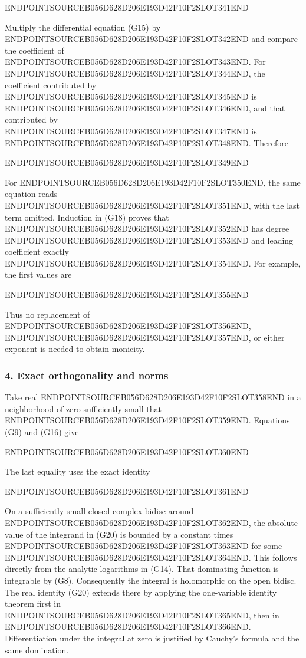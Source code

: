 ENDPOINTSOURCEB056D628D206E193D42F10F2SLOT341END

Multiply the differential equation (G15) by ENDPOINTSOURCEB056D628D206E193D42F10F2SLOT342END and compare the coefficient of ENDPOINTSOURCEB056D628D206E193D42F10F2SLOT343END. For ENDPOINTSOURCEB056D628D206E193D42F10F2SLOT344END, the coefficient contributed by ENDPOINTSOURCEB056D628D206E193D42F10F2SLOT345END is ENDPOINTSOURCEB056D628D206E193D42F10F2SLOT346END, and that contributed by ENDPOINTSOURCEB056D628D206E193D42F10F2SLOT347END is ENDPOINTSOURCEB056D628D206E193D42F10F2SLOT348END. Therefore

ENDPOINTSOURCEB056D628D206E193D42F10F2SLOT349END

For ENDPOINTSOURCEB056D628D206E193D42F10F2SLOT350END, the same equation reads ENDPOINTSOURCEB056D628D206E193D42F10F2SLOT351END, with the last term omitted. Induction in (G18) proves that ENDPOINTSOURCEB056D628D206E193D42F10F2SLOT352END has degree ENDPOINTSOURCEB056D628D206E193D42F10F2SLOT353END and leading coefficient exactly ENDPOINTSOURCEB056D628D206E193D42F10F2SLOT354END. For example, the first values are

ENDPOINTSOURCEB056D628D206E193D42F10F2SLOT355END

Thus no replacement of ENDPOINTSOURCEB056D628D206E193D42F10F2SLOT356END, ENDPOINTSOURCEB056D628D206E193D42F10F2SLOT357END, or either exponent is needed to obtain monicity.

\subsubsection{4. Exact orthogonality and norms}\label{endpoint-gamma_review--exact-orthogonality-and-norms}

Take real ENDPOINTSOURCEB056D628D206E193D42F10F2SLOT358END in a neighborhood of zero sufficiently small that ENDPOINTSOURCEB056D628D206E193D42F10F2SLOT359END. Equations (G9) and (G16) give

ENDPOINTSOURCEB056D628D206E193D42F10F2SLOT360END

The last equality uses the exact identity

ENDPOINTSOURCEB056D628D206E193D42F10F2SLOT361END

On a sufficiently small closed complex bidisc around ENDPOINTSOURCEB056D628D206E193D42F10F2SLOT362END, the absolute value of the integrand in (G20) is bounded by a constant times ENDPOINTSOURCEB056D628D206E193D42F10F2SLOT363END for some ENDPOINTSOURCEB056D628D206E193D42F10F2SLOT364END. This follows directly from the analytic logarithms in (G14). That dominating function is integrable by (G8). Consequently the integral is holomorphic on the open bidisc. The real identity (G20) extends there by applying the one-variable identity theorem first in ENDPOINTSOURCEB056D628D206E193D42F10F2SLOT365END, then in ENDPOINTSOURCEB056D628D206E193D42F10F2SLOT366END. Differentiation under the integral at zero is justified by Cauchy's formula and the same domination.

